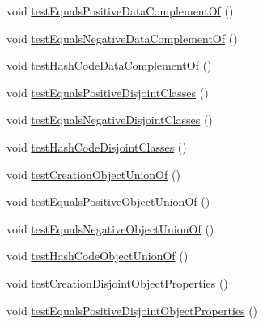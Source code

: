 \begin{DoxyCompactItemize}
\item 
void \hyperlink{classorg_1_1semanticweb_1_1owlapi_1_1datafactory_1_1_o_w_l_data_factory_test_case_acbc48f37accf5564dc73dd0c900b333e}{test\-Equals\-Positive\-Data\-Complement\-Of} ()
\item 
void \hyperlink{classorg_1_1semanticweb_1_1owlapi_1_1datafactory_1_1_o_w_l_data_factory_test_case_a9191af3912846dfa6c63f69094a28ee3}{test\-Equals\-Negative\-Data\-Complement\-Of} ()
\item 
void \hyperlink{classorg_1_1semanticweb_1_1owlapi_1_1datafactory_1_1_o_w_l_data_factory_test_case_a2109244797cdc66d11cde705624729f5}{test\-Hash\-Code\-Data\-Complement\-Of} ()
\item 
void \hyperlink{classorg_1_1semanticweb_1_1owlapi_1_1datafactory_1_1_o_w_l_data_factory_test_case_a3522aa5553e37f750fd075e35230be53}{test\-Equals\-Positive\-Disjoint\-Classes} ()
\item 
void \hyperlink{classorg_1_1semanticweb_1_1owlapi_1_1datafactory_1_1_o_w_l_data_factory_test_case_ace75b8ab8ec59142e18119f09f413ecd}{test\-Equals\-Negative\-Disjoint\-Classes} ()
\item 
void \hyperlink{classorg_1_1semanticweb_1_1owlapi_1_1datafactory_1_1_o_w_l_data_factory_test_case_a78455f5f9e48a8b20211c78316ac013d}{test\-Hash\-Code\-Disjoint\-Classes} ()
\item 
void \hyperlink{classorg_1_1semanticweb_1_1owlapi_1_1datafactory_1_1_o_w_l_data_factory_test_case_a97ee3edefe8083e01bb49ce58a9d98b2}{test\-Creation\-Object\-Union\-Of} ()
\item 
void \hyperlink{classorg_1_1semanticweb_1_1owlapi_1_1datafactory_1_1_o_w_l_data_factory_test_case_a6f73a898b0b0f48f366cf8f17b1aabca}{test\-Equals\-Positive\-Object\-Union\-Of} ()
\item 
void \hyperlink{classorg_1_1semanticweb_1_1owlapi_1_1datafactory_1_1_o_w_l_data_factory_test_case_a36c5a4d26c88d3f6a14851cfe06a71bf}{test\-Equals\-Negative\-Object\-Union\-Of} ()
\item 
void \hyperlink{classorg_1_1semanticweb_1_1owlapi_1_1datafactory_1_1_o_w_l_data_factory_test_case_ab8899772e1ed6b0826fb981c0f63bf43}{test\-Hash\-Code\-Object\-Union\-Of} ()
\item 
void \hyperlink{classorg_1_1semanticweb_1_1owlapi_1_1datafactory_1_1_o_w_l_data_factory_test_case_a73935209a730a996630f015b309d0f55}{test\-Creation\-Disjoint\-Object\-Properties} ()
\item 
void \hyperlink{classorg_1_1semanticweb_1_1owlapi_1_1datafactory_1_1_o_w_l_data_factory_test_case_af9c6ee8eea54d23c92b62fc34606d725}{test\-Equals\-Positive\-Disjoint\-Object\-Properties} ()

\end{DoxyCompactItemize}
